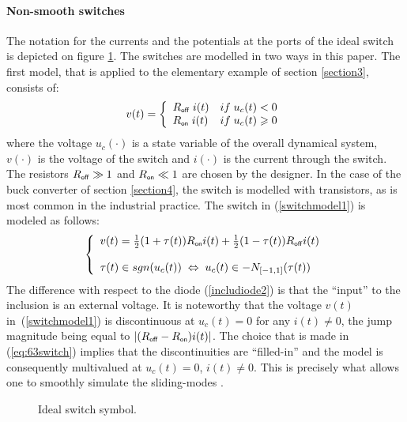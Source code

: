 \paragraph{Non-smooth switches}  The notation for the currents and the potentials at the ports of the ideal switch is depicted on figure \ref{fig:IDEAL_SWITCH}. The switches are modelled in two ways in this paper. The first model, that is applied to the elementary example of section \ref{section3}, consists of:
\begin{equation}\label{switchmodel1}
v(t)=\left\{\begin{array}{ll} R_\off\; i(t) & \mbox{if}\;u_{c}(t) < 0 \\   R_\on\; i(t) & \mbox{if}\;u_{c}(t) \geq  0  \end{array}\right.
\end{equation} 
where the voltage $u_{c}(\cdot)$ is a state variable of the overall dynamical system, $v(\cdot)$ is the voltage of the switch and $i(\cdot)$ is the current through the switch. The resistors $R_\off \gg 1$ and $R_\on \ll 1$ are chosen by the designer. In the case of the buck converter of section \ref{section4}, the switch is modelled with transistors, as is most common in the industrial practice. The switch in (\ref{switchmodel1}) is modeled as follows:
\begin{equation}
  \label{eq:63switch}
\left\{\begin{array}{l}
v(t)=\frac{1}{2}(1+\tau(t))R_\on i(t)+\frac{1}{2}(1-\tau(t))R_\off i(t)  \\ \\ \tau(t) \in \mbox{sgn}(u_{c}(t)) \; \Leftrightarrow \; u_{c}(t) \in -N_{[-1,1]}(\tau(t))
\end{array}\right.
\end{equation}
The difference with respect to the diode (\ref{includiode2}) is that the ``input'' to the inclusion is an external voltage. It is noteworthy that the voltage $v(t)$ in~(\ref{switchmodel1}) is discontinuous at $u_{c}(t)=0$ for any $i(t) \not = 0$, the jump magnitude being equal to $|(R_\off-R_\on)i(t)|$. The choice that is made in (\ref{eq:63switch}) implies that the discontinuities are ``filled-in'' and the model is consequently multivalued at $u_{c}(t)=0$,  $i(t) \not = 0$. This is precisely what allows one to smoothly simulate the sliding-modes \cite{Acary.Brogliato2009}. 



\begin{figure}
  \centering
  \scalebox{0.7}{
  
  }
  \caption{Ideal switch symbol.}
  \label{fig:IDEAL_SWITCH}
\end{figure}
 




